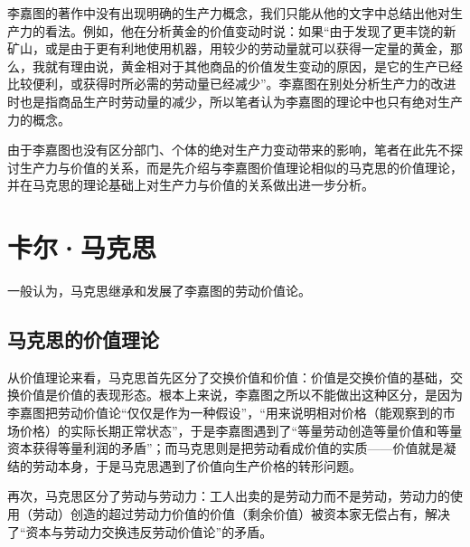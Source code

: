 李嘉图的著作中没有出现明确的生产力概念，我们只能从他的文字中总结出他对生产力的看法。例如，他在分析黄金的价值变动时说：如果“由于发现了更丰饶的新矿山，或是由于更有利地使用机器，用较少的劳动量就可以获得一定量的黄金，那么，我就有理由说，黄金相对于其他商品的价值发生变动的原因，是它的生产已经比较便利，或获得时所必需的劳动量已经减少”\cite[11]{DaWei*LiJiaTuZhengZhiJingJiXueJiFuShuiYuanLi2021}。李嘉图在别处分析生产力的改进时也是指商品生产时劳动量的减少，所以笔者认为李嘉图的理论中也只有绝对生产力的概念。

由于李嘉图也没有区分部门、个体的绝对生产力变动带来的影响，笔者在此先不探讨生产力与价值的关系，而是先介绍与李嘉图价值理论相似的马克思的价值理论，并在马克思的理论基础上对生产力与价值的关系做出进一步分析。

\section{卡尔·马克思}

一般认为，马克思继承和发展了李嘉图的劳动价值论\cite[347]{YueSeFu*XiongBiTeJingJiFenXiShiDi2Juan2017}\cite[84]{ChenDaiSunCongGuDianJingJiXuePaiDaoMaKeSiRuoGanZhuYaoXueShuoFaZhanLueLun2014}。

\subsection{马克思的价值理论}

从价值理论来看，马克思首先区分了交换价值和价值：价值是交换价值的基础，交换价值是价值的表现形态\cite[86-88]{ChenDaiSunCongGuDianJingJiXuePaiDaoMaKeSiRuoGanZhuYaoXueShuoFaZhanLueLun2014}。根本上来说，李嘉图之所以不能做出这种区分，是因为李嘉图把劳动价值论“仅仅是作为一种假设”，“用来说明相对价格（能观察到的市场价格）的实际长期正常状态”\cite[348]{YueSeFu*XiongBiTeJingJiFenXiShiDi2Juan2017}，于是李嘉图遇到了“等量劳动创造等量价值和等量资本获得等量利润的矛盾”\cite[144]{CaiJiMingCongGuDianZhengZhiJingJiXueDaoZhongGuoTeSeSheHuiZhuYiZhengZhiJingJiXueJiYuZhongGuoShiJiaoDeZhengZhiJingJiXueYanBianShangCe2023}\cite[21-28]{DaWei*LiJiaTuZhengZhiJingJiXueJiFuShuiYuanLi2021}；而马克思则是把劳动看成价值的实质——价值就是凝结的劳动本身，于是马克思遇到了价值向生产价格的转形问题\cite[348-350]{YueSeFu*XiongBiTeJingJiFenXiShiDi2Juan2017}\cite[159]{CaiJiMingCongGuDianZhengZhiJingJiXueDaoZhongGuoTeSeSheHuiZhuYiZhengZhiJingJiXueJiYuZhongGuoShiJiaoDeZhengZhiJingJiXueYanBianShangCe2023}。

再次，马克思区分了劳动与劳动力：工人出卖的是劳动力而不是劳动，劳动力的使用（劳动）创造的超过劳动力价值的价值（剩余价值）被资本家无偿占有，解决了“资本与劳动力交换违反劳动价值论”的矛盾\cite[615,581-606]{ZhongGongZhongYangMaKeSiEnGeSiLieNingSiDaLinZhuZuoBianYiJuMaKeSiEnGeSiWenJiDi5Juan2009}\cite[157-158]{CaiJiMingCongGuDianZhengZhiJingJiXueDaoZhongGuoTeSeSheHuiZhuYiZhengZhiJingJiXueJiYuZhongGuoShiJiaoDeZhengZhiJingJiXueYanBianShangCe2023}\cite[348]{YueSeFu*XiongBiTeJingJiFenXiShiDi2Juan2017}。

